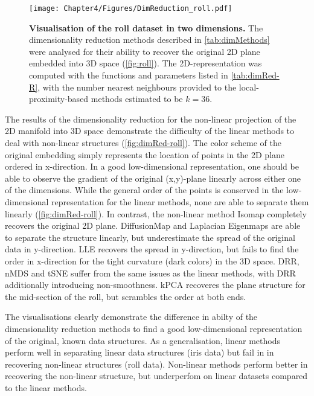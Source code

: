 \begin{figure}[hbtp]
	\centering
	\texttt{[image: Chapter4/Figures/DimReduction\_roll.pdf]}
	\caption[\textbf{Visualisation of the roll dataset in two dimensions.}]{\textbf{Visualisation of the roll dataset in two dimensions.} The dimensionality reduction methods described in \cref{tab:dimMethods} were analysed for their ability to recover the original 2D plane embedded into 3D space (\cref{fig:roll}). The 2D-representation was computed with the functions and parameters listed in \cref{tab:dimRed-R}, with the number nearest neighbours provided to the local-proximity-based methods estimated to be \(k=36\). } 
	 	\label{fig:TandC-roll}
\end{figure}


The results of the dimensionality reduction for the non-linear projection of the 2D manifold into 3D space demonstrate the difficulty of the linear methods to deal with non-linear structures (\cref{fig:dimRed-roll}). The color scheme of the original embedding simply represents the location of points in the 2D plane ordered in x-direction. In a good low-dimensional representation, one should be able to observe the gradient of the original (x,y)-plane linearly across either one of the dimensions. While the general order of the points is conserved in the low-dimensional representation for the linear methods, none are able to separate them linearly (\cref{fig:dimRed-roll}). In contrast, the non-linear method Isomap completely recovers the original 2D plane. DiffusionMap and Laplacian Eigenmaps are able to separate the structure linearly, but underestimate the spread of the original data in y-direction. LLE recovers the spread in y-direction, but fails to find the order in x-direction for the tight curvature (dark colors) in the 3D space. DRR, nMDS and tSNE suffer from the same issues as the linear methods, with DRR additionally introducing non-smoothness. kPCA recoveres the plane structure for the mid-section of the roll, but scrambles the order at both ends. 

The visualisations clearly demonstrate the difference in abilty of the dimensionality reduction methods to find a good low-dimensional representation of the original, known data structures. As a generalisation, linear methods perform well in separating linear data structures (iris data) but fail in in recovering non-linear structures (roll data). Non-linear methods perform better in recovering the non-linear structure, but underperfom on linear datasets compared to the linear methods. 

